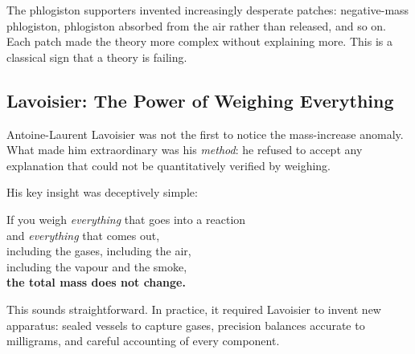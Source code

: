 \documentclass[12pt, a4paper]{book}
\theoremstyle{definition}
\begin{document}
\vspace{0.5em}

The phlogiston supporters invented increasingly desperate patches:
negative-mass phlogiston,
phlogiston absorbed from the air rather than released,
and so on.
Each patch made the theory more complex without explaining more.
This is a classical sign that a theory is failing.

\subsection{Lavoisier: The Power of Weighing Everything}

Antoine-Laurent Lavoisier was not the first to notice
the mass-increase anomaly.
What made him extraordinary was his \emph{method}:
he refused to accept any explanation that could not be
quantitatively verified by weighing.

His key insight was deceptively simple:

\begin{center}
\begin{tcolorbox}[
  enhanced, colback=DiscoveryColor!8, colframe=DiscoveryColor,
  width=0.82\textwidth, arc=3pt,
  fontupper=\sffamily\large\bfseries, halign=center
]
If you weigh \emph{everything} that goes into a reaction\\
and \emph{everything} that comes out,\\[4pt]
\normalfont\normalsize\sffamily
including the gases, including the air,\\
including the vapour and the smoke,\\[4pt]
\bfseries
the total mass does not change.
\end{tcolorbox}
\end{center}

\vspace{0.5em}

This sounds straightforward.
In practice, it required Lavoisier to invent new apparatus:
sealed vessels to capture gases,
precision balances accurate to milligrams,
and careful accounting of every component.
\end{document}
